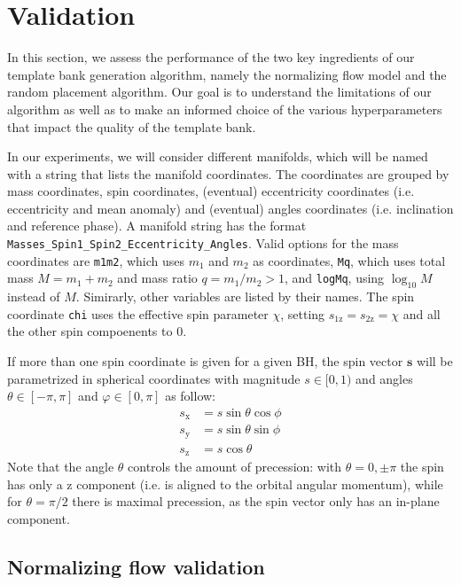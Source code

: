 \documentclass[twocolumn,showpacs,preprintnumbers,nofootinbib,prd,
superscriptaddress,10pt]{revtex4-2}
\begin{document}
\section{Validation} \label{sec:validation}

In this section, we assess the performance of the two key ingredients of our template bank generation algorithm, namely the normalizing flow model and the random placement algorithm.
Our goal is to understand the limitations of our algorithm as well as to make an informed choice of the various hyperparameters that impact the quality of the template bank.

In our experiments, we will consider different manifolds, which will be named with a string that lists the manifold coordinates. The coordinates are grouped by mass coordinates, spin coordinates, (eventual) eccentricity coordinates (i.e. eccentricity and mean anomaly) and (eventual) angles coordinates (i.e. inclination and reference phase).
A manifold string has the format \texttt{Masses\_Spin1\_Spin2\_Eccentricity\_Angles}.
Valid options for the mass coordinates are \texttt{m1m2}, which uses $m_1$ and $m_2$ as coordinates, \texttt{Mq}, which uses total mass $M = m_1+m_2$ and mass ratio $q = m_1/m_2 >1$, and \texttt{logMq}, using $\log_{10}M$ instead of $M$.
Simirarly, other variables are listed by their names.
The spin coordinate \texttt{chi} uses the effective spin parameter $\chi$, setting $s_\text{1z} = s_\text{2z} = \chi$ and all the other spin compoenents to $0$.

If more than one spin coordinate is given for a given BH, the spin vector $\mathbf{s}$ will be parametrized in spherical coordinates with magnitude $s \in [0,1)$ and angles $\theta \in [-\pi,\pi]$ and $\varphi \in [0, \pi]$ as follow:
%
\begin{align}
	s_\text{x} & = s \sin\theta \cos\phi \\
	s_\text{y} & = s \sin\theta \sin\phi \\
	s_\text{z} & = s \cos\theta
\end{align}
%
Note that the angle $\theta$ controls the amount of precession: with $\theta = 0, \pm \pi$ the spin has only a z component (i.e. is aligned to the orbital angular momentum), while for $\theta = \pi/2$ there is maximal precession, as the spin vector only has an in-plane component.

\subsection{Normalizing flow validation} \label{sec:flow_validation}
\end{document}

